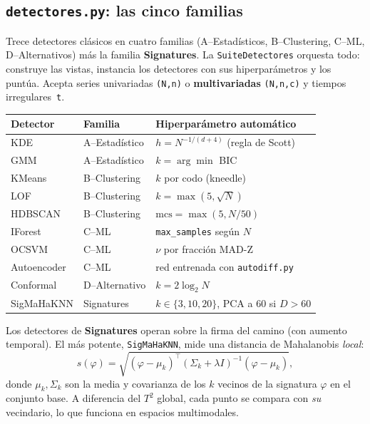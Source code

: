 \documentclass[11pt,a4paper]{article}
\begin{document}
\subsection{\texttt{detectores.py}: las cinco familias}

Trece detectores clásicos en cuatro familias (A--Estadísticos, B--Clustering,
C--ML, D--Alternativos) más la familia \textbf{Signatures}. La
\texttt{SuiteDetectores} orquesta todo: construye las vistas, instancia los
detectores con sus hiperparámetros y los puntúa. Acepta series univariadas
\texttt{(N,n)} o \textbf{multivariadas} \texttt{(N,n,c)} y tiempos
irregulares~\texttt{t}.

\begin{table}[h]\centering\small
\begin{tabular}{@{}lll@{}}
\toprule
Detector & Familia & Hiperparámetro automático \\ \midrule
KDE        & A--Estadístico & $h = N^{-1/(d+4)}$ (regla de Scott) \\
GMM        & A--Estadístico & $k=\arg\min$ BIC \\
KMeans     & B--Clustering  & $k$ por codo (kneedle) \\
LOF        & B--Clustering  & $k=\max(5,\sqrt{N})$ \\
HDBSCAN    & B--Clustering  & $\text{mcs}=\max(5,N/50)$ \\
IForest    & C--ML          & \texttt{max\_samples} según $N$ \\
OCSVM      & C--ML          & $\nu$ por fracción MAD-Z \\
Autoencoder& C--ML          & red entrenada con \texttt{autodiff.py} \\
Conformal  & D--Alternativo & $k=2\log_2 N$ \\
SigMaHaKNN & Signatures     & $k\in\{3,10,20\}$, PCA a 60 si $D>60$ \\
\bottomrule
\end{tabular}
\end{table}

\noindent Los detectores de \textbf{Signatures} operan sobre la firma del
camino (con aumento temporal). El más potente, \texttt{SigMaHaKNN}, mide una
distancia de Mahalanobis \emph{local}:
\[
s(\varphi)=\sqrt{(\varphi-\mu_k)^\top(\Sigma_k+\lambda I)^{-1}(\varphi-\mu_k)},
\]
donde $\mu_k,\Sigma_k$ son la media y covarianza de los $k$ vecinos de la
signatura $\varphi$ en el conjunto base. A diferencia del $T^2$ global, cada
punto se compara con \emph{su} vecindario, lo que funciona en espacios
multimodales.
\end{document}
